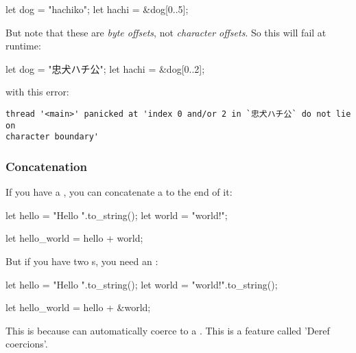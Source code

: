 \begin{rustc}
let dog = "hachiko";
let hachi = &dog[0..5];
\end{rustc}

But note that these are \emph{byte offsets}, not \emph{character offsets}. So this will fail at runtime:

\begin{rustc}
let dog = "忠犬ハチ公";
let hachi = &dog[0..2];
\end{rustc}

with this error:

\begin{verbatim}
thread '<main>' panicked at 'index 0 and/or 2 in `忠犬ハチ公` do not lie on
character boundary'
\end{verbatim}

\subsubsection*{Concatenation}

If you have a \String, you can concatenate a  to the end of it:

\begin{rustc}
let hello = "Hello ".to_string();
let world = "world!";

let hello_world = hello + world;
\end{rustc}

But if you have two \String s, you need an \code{\&}:

\begin{rustc}
let hello = "Hello ".to_string();
let world = "world!".to_string();

let hello_world = hello + &world;
\end{rustc}

This is because  can automatically coerce to a . This is a feature called 'Deref coercions'.
